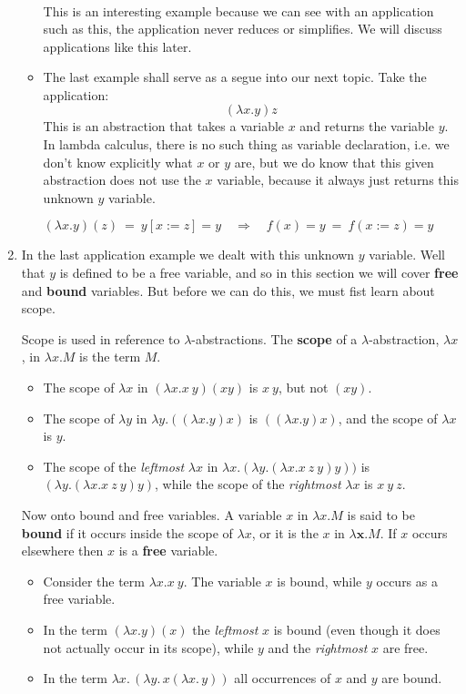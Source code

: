 \documentclass[12pt]{article}
\begin{document}
\begin{enumerate}
\begin{itemize}
\begin{align*}
\end{align*}
This is an interesting example because we can see with an application such as this, the application never reduces or simplifies. We will discuss applications like this later.
\item The last example shall serve as a segue into our next topic. Take the application: $$(\lambda x. y)z$$ This is an abstraction that takes a variable $x$ and returns the variable $y$. In lambda calculus, there is no such thing as variable declaration, i.e. we don't know explicitly what $x$ or $y$ are, but we do know that this given abstraction does not use the $x$ variable, because it always just returns this unknown $y$ variable. 
\begin{center}
$(\lambda x.y)(z) \ = \  y[x:=z] = y \quad \Rightarrow \quad f(x) = y \  = \  f(x:=z) = y$
\end{center}
\end{itemize}

\item In the last application example we dealt with this unknown $y$ variable. Well that $y$ is defined to be a free variable, and so in this section we will cover \textbf{free} and \textbf{bound} variables. But before we can do this, we must fist learn about scope. \par
Scope is used in reference to $\lambda$-abstractions. The \textbf{scope} of a $\lambda$-abstraction, $\lambda x$, in $\lambda x.M$ is the term $M$. 
\begin{itemize}
\item The scope of $\lambda x$ in $(\lambda x.x\ y)(xy)$ is $x\ y$, but not $(xy)$.
\item The scope of $\lambda y$ in $\lambda y. ((\lambda x. y)x)$ is $((\lambda x. y)x)$, and the scope of $\lambda x$ is $y$.
\item The scope of the \textit{leftmost} $\lambda x$ in $\lambda x.(\lambda y.(\lambda x. x\ z\ y)y))$ is $(\lambda y.(\lambda x. x\ z\ y)y)$, while the scope of the \textit{rightmost} $\lambda x$ is $x\ y\ z$.
\end{itemize}

Now onto bound and free variables. A variable $x$ in $\lambda x.M$ is said to be \textbf{bound} if it occurs inside the scope of $\lambda x$, or it is the $x$ in $\lambda \mathbf{x}.M$. If $x$ occurs elsewhere then $x$ is a \textbf{free} variable.
\begin{itemize}
\item Consider the term $\lambda x. x \ y$. The variable $x$ is bound, while $y$ occurs as a free variable. 
\item In the term $(\lambda x. y)(x)$ the \textit{leftmost} $x$ is bound (even though it does not actually occur in its scope), while $y$ and the \textit{rightmost} $x$ are free. 
\item In the term $\lambda x.\,(\lambda y. \,x(\lambda x.\,y))$ all occurrences of $x$ and $y$ are bound. 
\end{itemize}


\end{enumerate}
\end{document}
